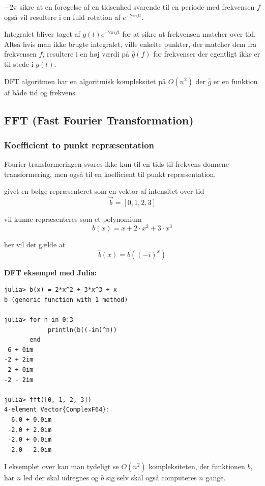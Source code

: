 \documentclass[11pt,a4paper]{article}
\begin{document}
\(-2\pi\) sikre at en forøgelse af en tidsenhed svarende til en periode med frekvensen \(f\) også vil resultere
i en fuld rotation af \(e^{-2\pi ift}\).

\bigskip

Integralet bliver taget af \(g(t)e^{-2\pi ift}\) for at sikre at frekvensen matcher over tid.
Altså hvis man ikke brugte integralet,
ville enkelte punkter, der matcher dem fra frekvensen \(f\), resultere i en høj værdi på \(\hat{g}(f)\) for frekvenser der egentligt ikke er til stede i \(g(t)\).

\bigskip

DFT algoritmen har en algoritmisk kompleksitet på \(O(n^2)\) der \(\hat{g}\) er en funktion af både tid og frekvens.

\newpage

\subsection{FFT (Fast Fourier Transformation)}
\label{sec:orgc7c9715}

\subsubsection{Koefficient to punkt repræsentation}
\label{sec:org0f6e23b}

Fourier transformeringen svares ikke kun til en tids til frekvens domæne transformering,
men også til en koefficient til punkt repræsentation.

\bigskip

givet en bølge repræsenteret som en vektor af intensitet over tid
$$
\vec{b} = [0, 1, 2, 3]
$$

vil kunne repræsenteres som et polynomium
$$
b(x) = x + 2\cdot x^2 + 3\cdot x^3
$$

her vil det gælde at
$$
\hat{b}(x) = b((-i)^x)
$$

\textbf{DFT eksempel med Julia:}
\begin{verbatim}
julia> b(x) = 2*x^2 + 3*x^3 + x
b (generic function with 1 method)

julia> for n in 0:3
            println(b((-im)^n))
       end
 6 + 0im
-2 + 2im
-2 + 0im
-2 - 2im

julia> fft([0, 1, 2, 3])
4-element Vector{ComplexF64}:
  6.0 + 0.0im
 -2.0 + 2.0im
 -2.0 + 0.0im
 -2.0 - 2.0im
\end{verbatim}

I eksemplet over kan man tydeligt se \(O(n^2)\) kompleksiteten,
der funktionen \(b\), har \(n\) led der skal udregnes
og \(b\) sig selv skal også computeres \(n\) gange.
\end{document}
